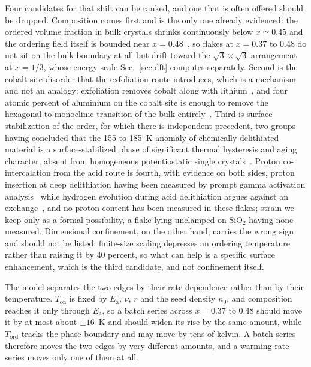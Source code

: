 \documentclass[reprint,twocolumn,prb,amsmath,amssymb,superscriptaddress,floatfix]{revtex4-2}
\newcommand{\Ea}{E_{\mathrm{a}}}
\newcommand{\Ton}{T_{\mathrm{on}}}
\newcommand{\Tcol}{T_{\mathrm{ord}}}
\begin{document}
Four candidates for that shift can be ranked, and one that is often offered should be dropped.
Composition comes first and is the only one already evidenced: the ordered volume fraction in
bulk crystals shrinks continuously below $x\simeq0.45$ and the ordering field itself is bounded
near $x=0.48$~\cite{Miyoshi2010,Motohashi2009}, so flakes at $x=0.37$ to 0.48 do not sit on the
bulk boundary at all but drift toward the $\sqrt3\times\sqrt3$ arrangement at $x=1/3$, whose
energy scale Sec.~\ref{sec:dft} computes separately. Second is the cobalt-site disorder that the
exfoliation route introduces, which is a mechanism and not an analogy: exfoliation removes
cobalt along with lithium~\cite{Pachuta2019}, and four atomic percent of aluminium on the cobalt
site is enough to remove the hexagonal-to-monoclinic transition of the bulk
entirely~\cite{ErRami2022}. Third is surface stabilization of the order, for which there
is independent precedent, two groups having concluded that the 155 to 185~K anomaly of
chemically delithiated material is a surface-stabilized phase of significant thermal hysteresis
and aging character, absent from homogeneous potentiostatic single
crystals~\cite{Hertz2008,OuYang2012}. Proton co-intercalation from the acid route is fourth,
with evidence on both sides, proton insertion at deep delithiation having been measured by
prompt gamma activation analysis~\cite{Choi2006} while hydrogen evolution during acid
delithiation argues against an exchange~\cite{Takahashi2007}, and no proton content has been
measured in these flakes; strain we keep only as a formal possibility, a flake lying unclamped
on SiO$_2$ having none measured. Dimensional confinement, on the other hand, carries the wrong
sign and should not be listed: finite-size scaling depresses an ordering temperature rather than
raising it by 40 percent, so what can help is a specific surface enhancement, which is the
third candidate, and not confinement itself.

The model separates the two edges by their rate dependence rather than by their temperature.
$\Ton$ is fixed by $\Ea$, $\nu$, $r$ and the seed density $n_{0}$, and composition reaches it
only through $\Ea$, so a batch series across $x=0.37$ to 0.48 should move it by at most about
$\pm16$~K and should widen its rise by the same amount, while $\Tcol$ tracks the phase boundary
and may move by tens of kelvin. A batch series therefore moves the two edges by very different
amounts, and a warming-rate series moves only one of them at all.
\end{document}
